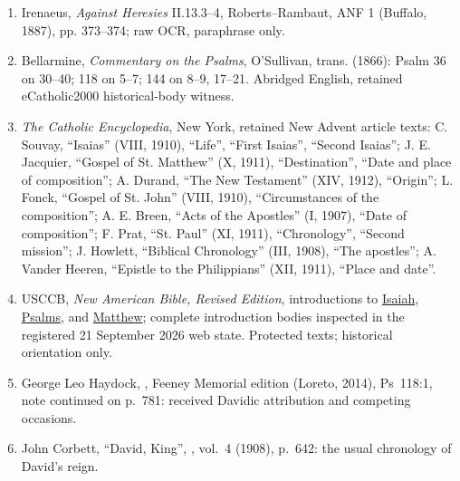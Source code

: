 \begin{enumerate}[leftmargin=1.6em,itemsep=0.25em,parsep=0pt]
\item Irenaeus, \textit{Against Heresies} II.13.3--4, Roberts--Rambaut, ANF 1 (Buffalo, 1887), pp. 373--374; raw OCR, paraphrase only.
\item Bellarmine, \textit{Commentary on the Psalms}, O'Sullivan, trans. (1866): Psalm 36 on 30--40; 118 on 5--7; 144 on 8--9, 17--21. Abridged English, retained eCatholic2000 historical-body witness.
\item \textit{The Catholic Encyclopedia}, New York, retained New Advent article texts: C. Souvay, ``Isaias'' (VIII, 1910), ``Life'', ``First Isaias'', ``Second Isaias''; J. E. Jacquier, ``Gospel of St. Matthew'' (X, 1911), ``Destination'', ``Date and place of composition''; A. Durand, ``The New Testament'' (XIV, 1912), ``Origin''; L. Fonck, ``Gospel of St. John'' (VIII, 1910), ``Circumstances of the composition''; A. E. Breen, ``Acts of the Apostles'' (I, 1907), ``Date of composition''; F. Prat, ``St. Paul'' (XI, 1911), ``Chronology'', ``Second mission''; J. Howlett, ``Biblical Chronology'' (III, 1908), ``The apostles''; A. Vander Heeren, ``Epistle to the Philippians'' (XII, 1911), ``Place and date''.
\item USCCB, \textit{New American Bible, Revised Edition}, introductions to \href{https://bible.usccb.org/bible/isaiah/0}{Isaiah}, \href{https://bible.usccb.org/bible/psalms/0}{Psalms}, and \href{https://bible.usccb.org/bible/matthew/0}{Matthew}; complete introduction bodies inspected in the registered 21 September 2026 web state. Protected texts; historical orientation only.
\item George Leo Haydock, , Feeney Memorial edition (Loreto, 2014), Ps~118:1, note continued on p.~781: received Davidic attribution and competing occasions.
\item John Corbett, ``David, King'', , vol.~4 (1908), p.~642: the usual chronology of David's reign.
\end{enumerate}
